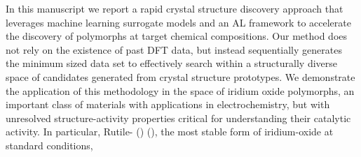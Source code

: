 

%
In this manuscript we report a rapid crystal structure discovery approach that leverages machine learning surrogate models and an AL framework to accelerate the discovery of polymorphs at target chemical compositions.
%
Our method does not rely on the existence of past DFT data,
but instead sequentially generates the minimum sized data set to effectively search within a structurally diverse space of candidates generated from crystal structure prototypes.
%
%
%
%
%
%
%
We demonstrate the application of this methodology in the space of iridium oxide polymorphs,
an important class of materials with applications in electrochemistry,
but with unresolved structure-activity properties critical for understanding their catalytic activity.
%
In particular, Rutile- (\rIrOtwo) (), the most stable form of iridium-oxide at standard conditions,
